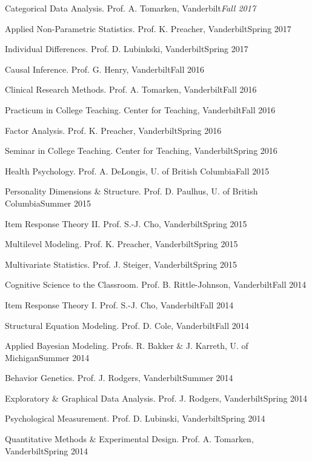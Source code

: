 \begin{etaremune}
\item Categorical Data Analysis. Prof. A. Tomarken, Vanderbilt\hfill{\textit{Fall 2017}}
\item Applied Non-Parametric Statistics.  Prof. K. Preacher, Vanderbilt\hfill{Spring 2017}
\item Individual Differences.  Prof. D. Lubinkski, Vanderbilt\hfill{Spring 2017}
\item Causal Inference. Prof. G. Henry, Vanderbilt\hfill{Fall 2016}
\item Clinical Research Methods. Prof. A. Tomarken, Vanderbilt\hfill{Fall 2016}
\item Practicum in College Teaching. Center for Teaching, Vanderbilt\hfill{Fall 2016}
\item Factor Analysis. Prof. K. Preacher, Vanderbilt\hfill{Spring 2016}
\item Seminar in College Teaching. Center for Teaching, Vanderbilt\hfill{Spring 2016}
\item Health Psychology.  Prof. A. DeLongis, U. of British Columbia\hfill{Fall 2015}
\item Personality Dimensions \& Structure.  Prof. D. Paulhus, U. of British Columbia\hfill{Summer 2015}
\item Item Response Theory \textrm{II}. Prof. S.-J. Cho, Vanderbilt\hfill{Spring 2015}
\item Multilevel Modeling. Prof. K. Preacher, Vanderbilt\hfill{Spring 2015}
\item Multivariate Statistics. Prof. J. Steiger, Vanderbilt\hfill{Spring 2015}
\item Cognitive Science to the Classroom. Prof. B. Rittle-Johnson, Vanderbilt\hfill{Fall 2014}
\item Item Response Theory \textrm{I}. Prof. S.-J. Cho, Vanderbilt\hfill{Fall 2014}
\item Structural Equation Modeling. Prof. D. Cole, Vanderbilt\hfill{Fall 2014}
\item Applied Bayesian Modeling. Profs. R. Bakker \& J. Karreth, U. of Michigan\hfill{Summer 2014}
\item Behavior Genetics. Prof. J. Rodgers, Vanderbilt\hfill{Summer 2014}
\item Exploratory \& Graphical Data Analysis. Prof. J. Rodgers, Vanderbilt\hfill{Spring 2014}
\item Psychological Measurement. Prof. D. Lubinski, Vanderbilt\hfill{Spring 2014}
\item Quantitative Methods \& Experimental Design. Prof. A. Tomarken, Vanderbilt\hfill{Spring 2014}

\end{etaremune}
